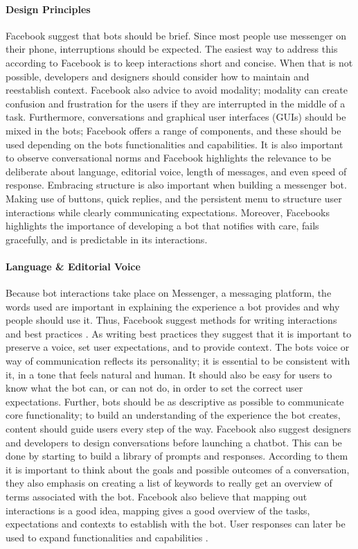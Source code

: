 \paragraph{Design Principles}
Facebook \cite{messenger_guidelines} suggest that bots should be brief. Since most people use messenger on their phone, interruptions should be expected. The easiest way to address this according to Facebook is to keep interactions short and concise. When that is not possible, developers and designers should consider how to maintain and reestablish context. Facebook \cite{messenger_guidelines} also advice to avoid modality; modality can create confusion and frustration for the users if they are interrupted in the middle of a task. Furthermore, conversations and graphical user interfaces (GUIs) should be mixed in the bots; Facebook offers a range of components, and these should be used depending on the bots functionalities and capabilities. It is also important to observe conversational norms and Facebook highlights the relevance to be deliberate about language, editorial voice, length of messages, and even speed of response. Embracing structure is also important when building a messenger bot. Making use of buttons, quick replies, and the persistent menu to structure user interactions while clearly communicating expectations. Moreover, Facebooks highlights the importance of developing a bot that notifies with care, fails gracefully, and is predictable in its interactions.

\paragraph{Language \& Editorial Voice}
Because bot interactions take place on Messenger, a messaging platform, the words used are important in explaining the experience a bot provides and why people should use it. Thus, Facebook suggest methods for writing interactions and best practices \cite{messenger_guidelines}. As writing best practices they suggest that it is important to preserve a voice, set user expectations, and to provide context. The bots voice or way of communication reflects its personality; it is essential to be consistent with it, in a tone that feels natural and human. It should also be easy for users to know what the bot can, or can not do, in order to set the correct user expectations. Further, bots should be as descriptive as possible to communicate core functionality; to build an understanding of the experience the bot creates, content should guide users every step of the way. Facebook also suggest designers and developers to design conversations before launching a chatbot. This can be done by starting to build a library of prompts and responses. According to them it is important to think about the goals and possible outcomes of a conversation, they also emphasis on creating a list of keywords to really get an overview of terms associated with the bot. Facebook also believe that mapping out interactions is a good idea, mapping gives a good overview of the tasks, expectations and contexts to establish with the bot. User responses can later be used to expand functionalities and capabilities \cite{messenger_guidelines}.

